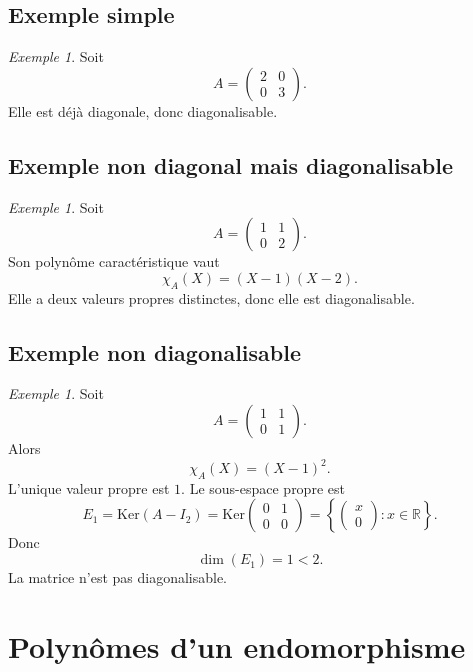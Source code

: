 \documentclass[11pt,a4paper]{article}
\theoremstyle{remark}
\newtheorem{exemple}[definition]{Exemple}
\newcommand{\R}{\mathbb{R}}
\newcommand{\Ker}{\mathrm{Ker}}
\newcommand{\chiA}{\chi_A}
\begin{document}
\subsection{Exemple simple}

\begin{exemple}
Soit
\[
A=
\begin{pmatrix}
2 & 0\\
0 & 3
\end{pmatrix}.
\]
Elle est déjà diagonale, donc diagonalisable.
\end{exemple}

\subsection{Exemple non diagonal mais diagonalisable}

\begin{exemple}
Soit
\[
A=
\begin{pmatrix}
1 & 1\\
0 & 2
\end{pmatrix}.
\]
Son polynôme caractéristique vaut
\[
\chiA(X)=(X-1)(X-2).
\]
Elle a deux valeurs propres distinctes, donc elle est diagonalisable.
\end{exemple}

\subsection{Exemple non diagonalisable}

\begin{exemple}
Soit
\[
A=
\begin{pmatrix}
1 & 1\\
0 & 1
\end{pmatrix}.
\]
Alors
\[
\chiA(X)=(X-1)^2.
\]
L’unique valeur propre est \(1\). Le sous-espace propre est
\[
E_1=\Ker(A-I_2)=
\Ker\begin{pmatrix}
0 & 1\\
0 & 0
\end{pmatrix}
=
\left\{
\begin{pmatrix}
x\\
0
\end{pmatrix}
: x\in\R
\right\}.
\]
Donc
\[
\dim(E_1)=1<2.
\]
La matrice n’est pas diagonalisable.
\end{exemple}

\section{Polynômes d’un endomorphisme}
\end{document}
